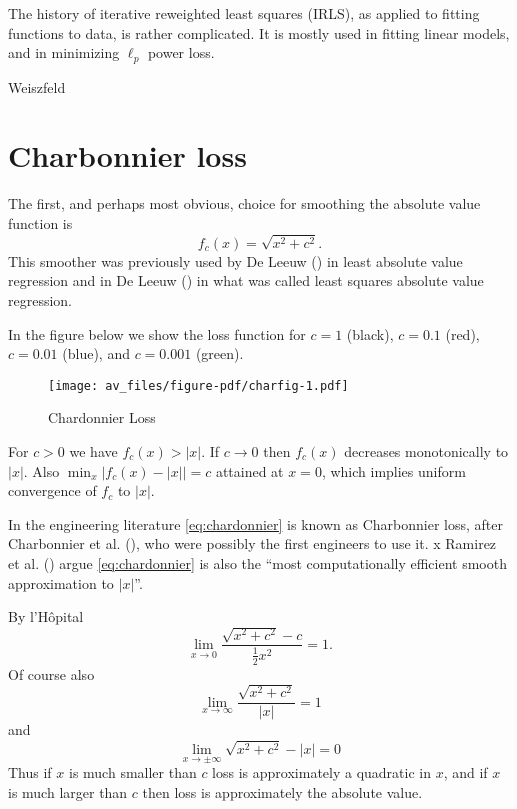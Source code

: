\documentclass[
  12pt,
  letterpaper,
  DIV=11,
  numbers=noendperiod]{scrartcl}
\newcommand{\sectionbreak}{\pagebreak}
\begin{document}
The history of iterative reweighted least squares (IRLS), as applied to
fitting functions to data, is rather complicated. It is mostly used in
fitting linear models, and in minimizing \(\ell_p\) power loss.

Weiszfeld

\sectionbreak

\section{Charbonnier loss}\label{charbonnier-loss}

The first, and perhaps most obvious, choice for smoothing the absolute
value function is \begin{equation}
f_c(x)=\sqrt{x^2 + c^2}.\label{eq:chardonnier}
\end{equation} This smoother was previously used by De Leeuw
() in least absolute value regression
and in De Leeuw () in what was called
least squares absolute value regression.

In the figure below we show the loss function for \(c=1\) (black),
\(c=0.1\) (red), \(c=0.01\) (blue), and \(c=0.001\) (green).

\begin{figure}[H]

{\centering \texttt{[image: av\_files/figure-pdf/charfig-1.pdf]}

}

\caption{Chardonnier Loss}

\end{figure}%

For \(c>0\) we have \(f_c(x)>|x|\). If \(c\rightarrow 0\) then
\(f_c(x)\) decreases monotonically to \(|x|\). Also
\(\min_x|f_c(x)-|x||=c\) attained at \(x=0\), which implies uniform
convergence of \(f_c\) to \(|x|\).

In the engineering literature \eqref{eq:chardonnier} is known as
Charbonnier loss, after Charbonnier et al.
(), who
were possibly the first engineers to use it. x Ramirez et al.
() argue
\eqref{eq:chardonnier} is also the ``most computationally efficient
smooth approximation to \(|x|\)''.

By l'Hôpital \[
\lim_{x\rightarrow 0}\frac{\sqrt{x^2+c^2}-c}{\frac12x^2}=1.
\] Of course also \[
\lim_{x\rightarrow\infty}\frac{\sqrt{x^2+c^2}}{|x|}=1
\] and \[
\lim_{x\rightarrow\pm\infty}\sqrt{x^2+c^2}-|x|=0
\] Thus if \(x\) is much smaller than \(c\) loss is approximately a
quadratic in \(x\), and if \(x\) is much larger than \(c\) then loss is
approximately the absolute value.
\end{document}
